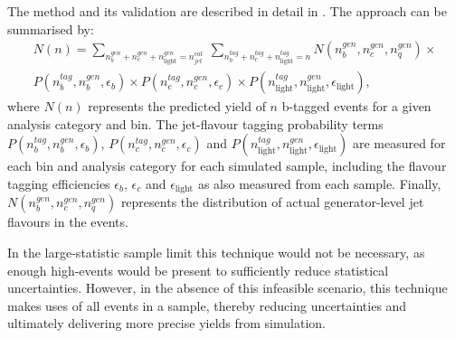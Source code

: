 The method and its validation are described in detail in
\cite{an_alphat_hcp_12fb}. The approach can be summarised by:
% 
\begin{equation}
  \begin{split}
  N(n) = \sum_{n_b^{gen} + n_c^{gen} + n_{\text{light}}^{gen} = n_{jet}^{cat}}\:
  \sum_{n_b^{tag} + n_c^{tag} + n_{\text{light}}^{tag} = n}
  N(n_b^{gen}, n_c^{gen}, n_q^{gen}) \times \\
  P(n_b^{tag}, n_b^{gen}, \epsilon_{b}) \times
  P(n_c^{tag}, n_c^{gen}, \epsilon_{c}) \times
  P(n_{\text{light}}^{tag}, n_{\text{light}}^{gen}, \epsilon_{\text{light}}) ,
  \end{split}
\end{equation}
% 
where $N(n)$ represents the predicted yield of $n$ b-tagged events for a
given
analysis category and \HT bin. The jet-flavour tagging probability
terms $P(n_b^{tag}, n_b^{gen}, \epsilon_{b})$,
$P(n_c^{tag}, n_c^{gen}, \epsilon_{c})$ and 
$P(n_{\text{light}}^{tag}, n_{\text{light}}^{gen}, \epsilon_{\text{light}})$ are measured for each \HT bin and
analysis category for each simulated sample, including the flavour tagging
efficiencies $\epsilon_b$, $\epsilon_c$ and $\epsilon_{\text{light}}$ as also
measured from
each sample. Finally, $N(n_b^{gen}, n_c^{gen}, n_q^{gen})$ represents the
distribution of actual generator-level jet flavours in the events.

In the large-statistic sample limit this technique would not be necessary,
as enough high-\nb events would be present to sufficiently reduce statistical
uncertainties. However, in the absence of this infeasible scenario,
this technique
makes uses of all events in a sample, thereby reducing uncertainties
and ultimately delivering more precise yields from simulation.
